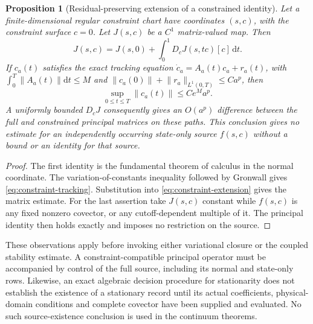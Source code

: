\documentclass[11pt]{article}
\numberwithin{equation}{section}
\newtheorem{proposition}[proposition]{Proposition}
\theoremstyle{definition}
\theoremstyle{remark}
\newcommand{\dd}{\mathrm d}
\newcommand{\norm}[1]{\lVert#1\rVert}
\begin{document}
\begin{proposition}[Residual-preserving extension of a constrained identity]
\label{prop:constraint-extension}
Let a finite-dimensional regular constraint chart have coordinates $(s,c)$,
with the constraint surface $c=0$.  Let $J(s,c)$ be a $C^1$ matrix-valued map.
Then
\begin{equation}
 J(s,c)=J(s,0)+\int_0^1D_cJ(s,tc)[c]\,\dd t.
 \label{eq:constraint-extension}
\end{equation}
If $c_a(t)$ satisfies the exact tracking equation
$\dot c_a=A_a(t)c_a+r_a(t)$, with
$\int_0^T\norm{A_a(t)}\dd t\le M$ and
$\norm{c_a(0)}+\norm{r_a}_{L^1(0,T)}\le Ca^p$, then
\begin{equation}
 \sup_{0\le t\le T}\norm{c_a(t)}\le Ce^M a^p.
 \label{eq:constraint-tracking}
\end{equation}
A uniformly bounded $D_cJ$ consequently gives an $O(a^p)$ difference
between the full and constrained principal matrices on these paths.
This conclusion gives no estimate for an independently occurring
state-only source $f(s,c)$ without a bound or an identity for that source.
\end{proposition}
\begin{proof}
The first identity is the fundamental theorem of calculus in the normal
coordinate.  The variation-of-constants inequality followed by Gronwall
gives \eqref{eq:constraint-tracking}.  Substitution into
\eqref{eq:constraint-extension} gives the matrix estimate.
For the last assertion take $J(s,c)$ constant while $f(s,c)$ is any fixed
nonzero covector, or any cutoff-dependent multiple of it.  The principal
identity then holds exactly and imposes no restriction on the source.
\end{proof}

These observations apply before invoking either variational closure or the
coupled stability estimate.  A constraint-compatible principal operator
must be accompanied by control of the full source, including its normal
and state-only rows.  Likewise, an exact algebraic decision procedure for
stationarity does not establish the existence of a stationary record until
its actual coefficients, physical-domain conditions and complete covector
have been supplied and evaluated.  No such source-existence conclusion is
used in the continuum theorems.
\end{document}
